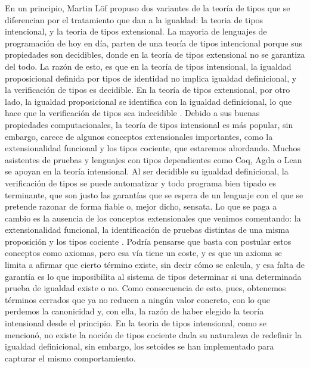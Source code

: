 En un principio, Martin Löf propuso dos variantes de la teoría de tipos que se diferencian por el tratamiento que dan a la igualdad: la teoria de tipos intencional, y la teoria de tipos extensional. La mayoria de lenguajes de programación de hoy en día, parten de una teoría de tipos intencional porque sus propiedades son decidibles, donde en la teoría de tipos extensional no se garantiza del todo. La razón de esto, es que en la teoría de tipos intensional, la igualdad proposicional definida por tipos de identidad no implica igualdad definicional, y la verificación de tipos es decidible. En la teoría de tipos extensional, por otro lado, la igualdad proposicional se identifica con la igualdad definicional, lo que hace que la verificación de tipos sea indecidible \citep{nuoli}.
\newline
\newline
\indent Debido a sus buenas propiedades computacionales, la teoría de tipos intensional es más popular, sin embargo, carece de algunos conceptos extensionales importantes, como la extensionalidad funcional y los tipos cociente, que estaremos abordando.
\newline
\newline
\indent Muchos asistentes de pruebas y lenguajes con tipos dependientes como Coq, Agda o Lean se apoyan en la teoría intensional. Al ser decidible su igualdad definicional, la verificación de tipos se puede automatizar y todo programa bien tipado es terminante, que son justo las garantías que se espera de un lenguaje con el que se pretende razonar de forma fiable o, mejor dicho, sensata. Lo que se paga a cambio es la ausencia de los conceptos extensionales que venimos comentando: la extensionalidad funcional, la identificación de pruebas distintas de una misma proposición y los tipos cociente \citep{nuoli}.
\newline
\newline
\indent Podría pensarse que basta con postular estos conceptos como axiomas, pero esa vía tiene un coste, y es que un axioma se limita a afirmar que cierto término existe, sin decir cómo se calcula, y esa falta de garantía es lo que imposibilita al sistema de tipos determinar si una determinada prueba de igualdad existe o no. Como consecuencia de esto, pues, obtenemos términos cerrados que ya no reducen a ningún valor concreto, con lo que perdemos la canonicidad y, con ella, la razón de haber elegido la teoría intensional desde el principio.
\newline
\newline
\indent En la teoria de tipos intensional, como se mencionó, no existe la noción de tipos cociente dada su naturaleza de redefinir la igualdad definicional, sin embargo, los setoides se han implementado para capturar el mismo comportamiento.
